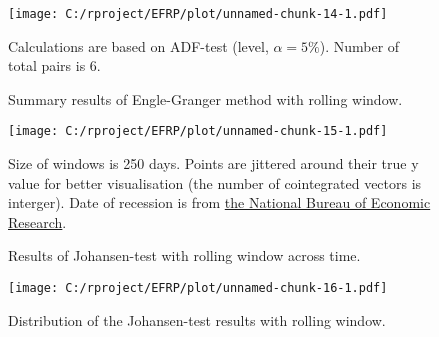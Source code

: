 \documentclass[12pt, a4paper, twoside, titlepage]{article}
\begin{document}
\begin{figure}[ht]
  \centering
  \texttt{[image: C:/rproject/EFRP/plot/unnamed-chunk-14-1.pdf]}
  \label{fig6}
  \caption{Summary results of Engle-Granger method with rolling window.}
  Calculations are based on ADF-test (level, $\alpha = 5\%$). Number of total pairs is 6.
\end{figure}

\begin{figure}[ht]
  \centering
  \texttt{[image: C:/rproject/EFRP/plot/unnamed-chunk-15-1.pdf]}
  \label{fig7}
  \caption{Results of Johansen-test with rolling window across time.}
  Size of windows is 250 days. Points are jittered around their true y value for better visualisation (the number of cointegrated vectors is interger). Date of recession is from \href{https://www.nber.org/cycles.html}{the National Bureau of Economic Research}.
\end{figure}

\begin{figure}[ht]
  \centering
  \texttt{[image: C:/rproject/EFRP/plot/unnamed-chunk-16-1.pdf]}
  \label{fig8}
  \caption{Distribution of the Johansen-test results with rolling window.}
\end{figure}

\begin{appendix}
  \listoffigures
  \listoftables
\end{appendix}



\end{document}
